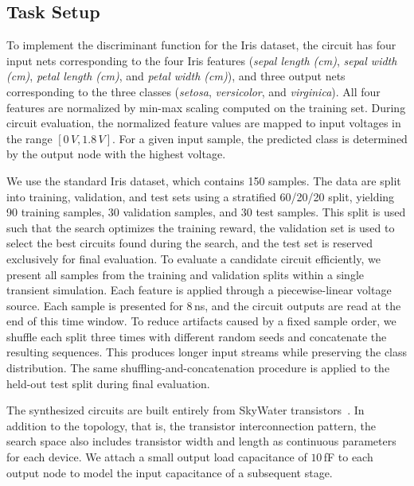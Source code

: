 \documentclass[sigconf,pbalance]{acmart_modified}
\newcommand{\squeezeSubSection}{}
\begin{document}
\squeezeSubSection\subsection{Task Setup}
\label{subsec:analog_discriminant}
To implement the discriminant function for the Iris dataset, the circuit has four input nets corresponding to the four Iris features (\emph{sepal length (cm)}, \emph{sepal width (cm)}, \emph{petal length (cm)}, and \emph{petal width (cm)}), and three output nets corresponding to the three classes (\emph{setosa}, \emph{versicolor}, and \emph{virginica}). All four features are normalized by min-max scaling computed on the training set. During circuit evaluation, the normalized feature values are mapped to input voltages in the range $[0\,V, 1.8\,V]$. For a given input sample, the predicted class is determined by the output node with the highest voltage.

We use the standard Iris dataset, which contains 150 samples. The data are split into training, validation, and test sets using a stratified 60/20/20 split, yielding 90 training samples, 30 validation samples, and 30 test samples. This split is used such that the search optimizes the training reward, the validation set is used to select the best circuits found during the search, and the test set is reserved exclusively for final evaluation. To evaluate a candidate circuit efficiently, we present all samples from the training and validation splits within a single transient simulation. Each feature is applied through a piecewise-linear voltage source. Each sample is presented for $8\,$ns, and the circuit outputs are read at the end of this time window. To reduce artifacts caused by a fixed sample order, we shuffle each split three times with different random seeds and concatenate the resulting sequences. This produces longer input streams while preserving the class distribution. The same shuffling-and-concatenation procedure is applied to the held-out test split during final evaluation.

The synthesized circuits are built entirely from SkyWater transistors~\cite{skywater130pdk}. In addition to the topology, that is, the transistor interconnection pattern, the search space also includes transistor width and length as continuous parameters for each device. We attach a small output load capacitance of $10\,$fF to each output node to model the input capacitance of a subsequent stage.
\end{document}
